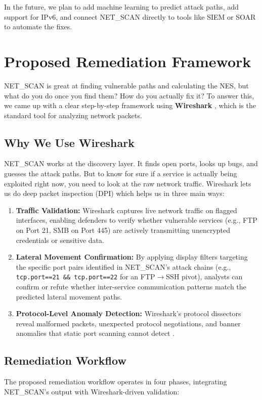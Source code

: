 \documentclass[conference]{IEEEtran}
\begin{document}
In the future, we plan to add machine learning to predict attack paths, add support for IPv6, and connect NET\_SCAN directly to tools like SIEM or SOAR to automate the fixes.

\section{Proposed Remediation Framework}
NET\_SCAN is great at finding vulnerable paths and calculating the NES, but what do you do once you find them? How do you actually fix it? To answer this, we came up with a clear step-by-step framework using \textbf{Wireshark} \cite{wireshark_ref}, which is the standard tool for analyzing network packets.

\subsection{Why We Use Wireshark}
NET\_SCAN works at the discovery layer. It finds open ports, looks up bugs, and guesses the attack paths. But to know for sure if a service is actually being exploited right now, you need to look at the raw network traffic. Wireshark lets us do deep packet inspection (DPI) which helps us in three main ways:
\begin{enumerate}
    \item \textbf{Traffic Validation:} Wireshark captures live network traffic on flagged interfaces, enabling defenders to verify whether vulnerable services (e.g., FTP on Port 21, SMB on Port 445) are actively transmitting unencrypted credentials or sensitive data.
    \item \textbf{Lateral Movement Confirmation:} By applying display filters targeting the specific port pairs identified in NET\_SCAN's attack chains (e.g., \texttt{tcp.port==21 \&\& tcp.port==22} for an FTP$\to$SSH pivot), analysts can confirm or refute whether inter-service communication patterns match the predicted lateral movement paths.
    \item \textbf{Protocol-Level Anomaly Detection:} Wireshark's protocol dissectors reveal malformed packets, unexpected protocol negotiations, and banner anomalies that static port scanning cannot detect \cite{sanders2017}.
\end{enumerate}

\subsection{Remediation Workflow}
The proposed remediation workflow operates in four phases, integrating NET\_SCAN's output with Wireshark-driven validation:
\end{document}
